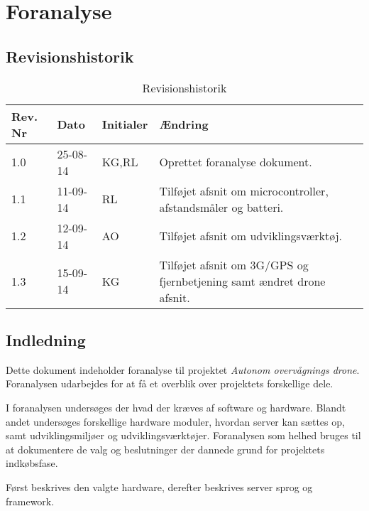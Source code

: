 \chapter{Foranalyse}

\section{Revisionshistorik}
\begin{table}[H]
	\centering
		\begin{tabular}{|p{2 cm}|p{2 cm}|p{2 cm}|p{7 cm}|} 
		\hline
			\textbf{Rev. Nr} & \textbf{Dato}		& \textbf{Initialer} 	& \textbf{Ændring} \\ \hline
			1.0 	& 25-08-14	& KG,RL		& Oprettet foranalyse dokument.	\\ \hline
			1.1 	& 11-09-14	& RL		& Tilføjet afsnit om microcontroller, afstandsmåler og batteri.	\\ \hline
			1.2 	& 12-09-14	& AO		& Tilføjet afsnit om udviklingsværktøj.	\\ \hline	1.3 	& 15-09-14	& KG		& Tilføjet afsnit om 3G/GPS og fjernbetjening samt ændret drone afsnit.	\\ \hline
		\end{tabular}
	\caption{Revisionshistorik}
\end{table}

\vspace{6.5cm}


\section{Indledning}

Dette dokument indeholder foranalyse til projektet \textit{Autonom overvågnings drone}. 
Foranalysen udarbejdes for at få et overblik over projektets forskellige dele. 

I foranalysen undersøges der hvad der kræves af software og hardware. Blandt andet undersøges forskellige hardware moduler, hvordan server kan sættes op, samt udviklingsmiljøer og udviklingsværktøjer. Foranalysen som helhed bruges til at dokumentere de valg og beslutninger der dannede grund for projektets indkøbsfase. 

Først beskrives den valgte hardware, derefter beskrives server sprog og framework.
